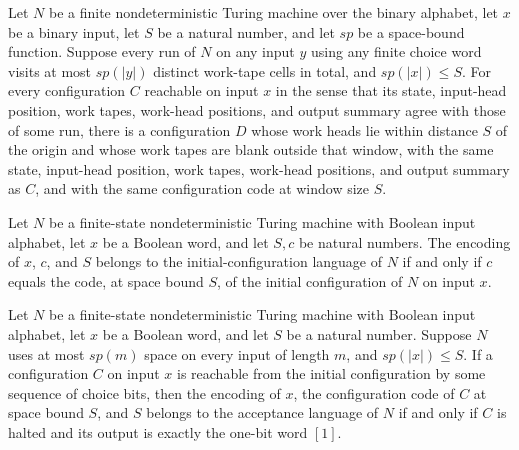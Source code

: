 \begin{theorem}
\label{Randomized.PolyAmp.Reach.inWin}
\leanok
{}
Let $N$ be a finite nondeterministic Turing machine over the binary alphabet, let $x$ be
a binary input, let $S$ be a natural number, and let $sp$ be a space-bound function.
Suppose every run of $N$ on any input $y$ using any finite choice word visits at most
$sp(|y|)$ distinct work-tape cells in total, and $sp(|x|)\le S$. For every configuration
$C$ reachable on input $x$ in the sense that its state, input-head position, work tapes,
work-head positions, and output summary agree with those of some run, there is a
configuration $D$ whose work heads lie within distance $S$ of the origin and whose work
tapes are blank outside that window, with the same state, input-head position, work
tapes, work-head positions, and output summary as $C$, and with the same configuration
code at window size $S$.
\end{theorem}

\begin{theorem}
\label{Randomized.PolyAmp.mem_initLang_iff}
\leanok
{}
Let $N$ be a finite-state nondeterministic Turing machine with Boolean input alphabet,
let $x$ be a Boolean word, and let $S,c$ be natural numbers. The encoding of $x$, $c$,
and $S$ belongs to the initial-configuration language of $N$ if and only if $c$ equals
the code, at space bound $S$, of the initial configuration of $N$ on input $x$.
\end{theorem}

\begin{theorem}
\label{Randomized.PolyAmp.mem_acceptLang_iff}
\leanok
{}
Let $N$ be a finite-state nondeterministic Turing machine with Boolean input alphabet,
let $x$ be a Boolean word, and let $S$ be a natural number. Suppose $N$ uses at most
$sp(m)$ space on every input of length $m$, and $sp(\lvert x\rvert)\le S$. If a
configuration $C$ on input $x$ is reachable from the initial configuration by some
sequence of choice bits, then the encoding of $x$, the configuration code of $C$ at
space bound $S$, and $S$ belongs to the acceptance language of $N$ if and only if $C$ is
halted and its output is exactly the one-bit word $[1]$.
\end{theorem}

